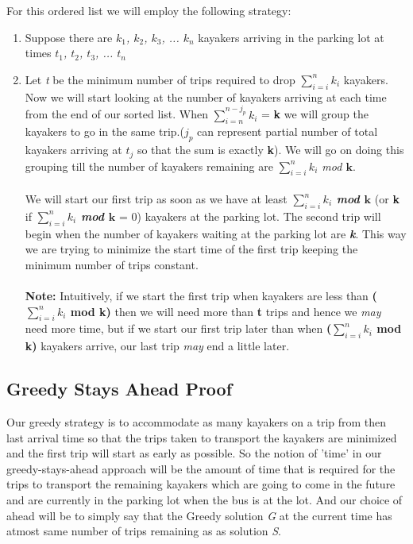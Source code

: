 \documentclass[8pt]{article}
\begin{document}
For this ordered list we will employ the following strategy:
\begin{enumerate}
    \item Suppose there are \textit{$k_1$, $k_2$, $k_3$, ... $k_n$} kayakers arriving in the parking lot at times \textit{$t_1$, $t_2$, $t_3$, ... $t_n$}
    \item Let \textit{t} be the minimum number of trips required to drop $\sum_{i=i}^{n}k_i$ kayakers. Now we will start looking at the number of kayakers arriving at each time from the end of our sorted list. When $\sum_{i=n}^{n-j_p}k_i$ = \textbf{k} we will group the kayakers to go in the same trip.(\textit{$j_p$} can represent partial number of total kayakers arriving at \textit{$t_j$} so that the sum is exactly \textbf{k}). We will go on doing this grouping till the number of kayakers remaining are \textit{$\sum_{i=i}^nk_i$ mod $\textbf{k}$}. \\ \\
        We will start our first trip as soon as we have at least \textbf{\textit{$\sum_{i=i}^nk_i$ mod $\textbf{k}$}} (or \textbf{k} if \textbf{\textit{$\sum_{i=i}^nk_i$ mod $\textbf{k}$}} = 0) kayakers at the parking lot. The second trip will begin when the number of kayakers waiting at the parking lot are \textit{\textbf{k}}. This way we are trying to minimize the start time of the first trip keeping the minimum number of trips constant.
\\ \\
{\footnotesize \textbf{Note:} Intuitively, if we start the first trip when kayakers are less than \textbf{($\sum_{i=i}^nk_i$ mod k)} then we will need more than \textbf{t} trips and hence we \textit{may} need more time, but if we start our first trip later than when \textbf{($\sum_{i=i}^nk_i$ mod k)} kayakers arrive, our last trip \textit{may} end a little later.}
\end{enumerate}

\subsection{Greedy Stays Ahead Proof}
Our greedy strategy is to accommodate as many kayakers on a trip from then last arrival time so that the trips taken to transport the kayakers are minimized and the first trip will start as early as possible. So the notion of 'time' in our greedy-stays-ahead approach will be the amount of time that is required for the trips to transport the remaining kayakers which are going to come in the future and are currently in the parking lot when the bus is at the lot. And our choice of ahead will be to simply say that the Greedy solution \textit{G} at the current time has atmost same number of trips remaining as as solution \textit{S}.
\end{document}
